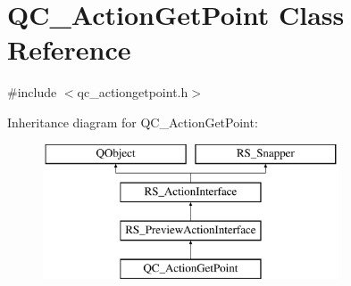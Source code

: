\hypertarget{classQC__ActionGetPoint}{\section{Q\-C\-\_\-\-Action\-Get\-Point Class Reference}
\label{classQC__ActionGetPoint}
}


{\ttfamily \#include $<$qc\-\_\-actiongetpoint.\-h$>$}

Inheritance diagram for Q\-C\-\_\-\-Action\-Get\-Point\-:\begin{figure}[H]
\begin{center}
\leavevmode
\includegraphics[height=4.000000cm]{classQC__ActionGetPoint}
\end{center}
\end{figure}
